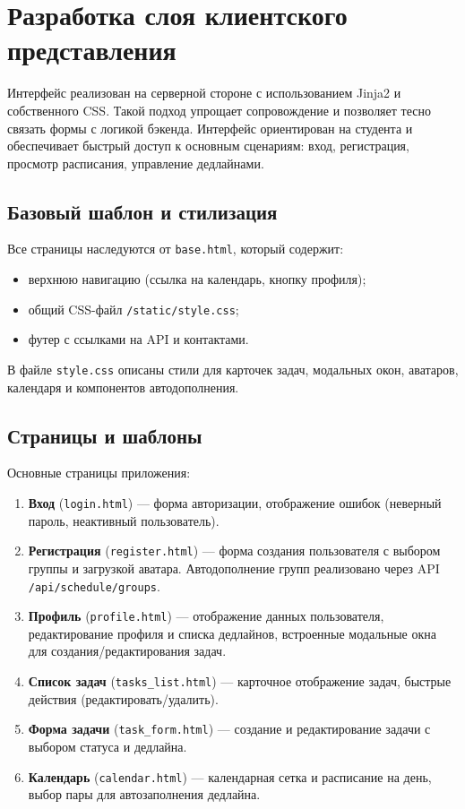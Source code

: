 \section{Разработка слоя клиентского представления}

Интерфейс реализован на серверной стороне с использованием Jinja2 и собственного CSS. Такой подход упрощает сопровождение и позволяет тесно связать формы с логикой бэкенда. Интерфейс ориентирован на студента и обеспечивает быстрый доступ к основным сценариям: вход, регистрация, просмотр расписания, управление дедлайнами.

\subsection{Базовый шаблон и стилизация}

Все страницы наследуются от \texttt{base.html}, который содержит:
\begin{itemize}
    \item верхнюю навигацию (ссылка на календарь, кнопку профиля);
    \item общий CSS-файл \texttt{/static/style.css};
    \item футер с ссылками на API и контактами.
\end{itemize}
В файле \texttt{style.css} описаны стили для карточек задач, модальных окон, аватаров, календаря и компонентов автодополнения.

\subsection{Страницы и шаблоны}

Основные страницы приложения:
\begin{enumerate}
    \item \textbf{Вход} (\texttt{login.html}) --- форма авторизации, отображение ошибок (неверный пароль, неактивный пользователь).
    \item \textbf{Регистрация} (\texttt{register.html}) --- форма создания пользователя с выбором группы и загрузкой аватара. Автодополнение групп реализовано через API \texttt{/api/schedule/groups}.
    \item \textbf{Профиль} (\texttt{profile.html}) --- отображение данных пользователя, редактирование профиля и списка дедлайнов, встроенные модальные окна для создания/редактирования задач.
    \item \textbf{Список задач} (\texttt{tasks\_list.html}) --- карточное отображение задач, быстрые действия (редактировать/удалить).
    \item \textbf{Форма задачи} (\texttt{task\_form.html}) --- создание и редактирование задачи с выбором статуса и дедлайна.
    \item \textbf{Календарь} (\texttt{calendar.html}) --- календарная сетка и расписание на день, выбор пары для автозаполнения дедлайна.
\end{enumerate}

